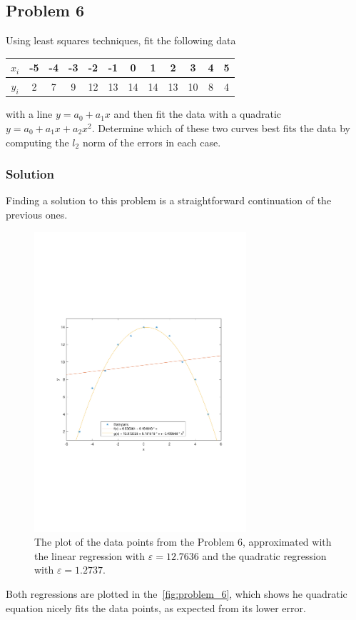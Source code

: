 \subsection{Problem 6}%
\label{sec:problem_6}
Using least squares techniques, fit the following data
\begin{center}
  \begin{tabular}{|c|c|c|c|c|c|c|c|c|c|c|c|}
    \hline
    $x_i$ & -5 & -4 & -3 & -2 & -1 & 0 & 1 & 2 & 3 & 4 & 5 \\
    \hline
    $y_i$ & 2 & 7 & 9 & 12 & 13 & 14 & 14 & 13 & 10 & 8 & 4 \\
    \hline
  \end{tabular}
\end{center}
with a line $y=a_0+a_1x$ and then fit the data with a quadratic $y=a_0+a_1x+a_2x^2$.
Determine which of these two curves best fits the data by computing the $l_2$ norm of
the errors in each case.
\subsubsection*{Solution}
Finding a solution to this problem is a straightforward continuation of the previous
ones.

\begin{figure}
  \centering
  \includegraphics[width=0.7\textwidth]{images/Problem_6_plot.pdf}
  \caption{The plot of the data points from the Problem 6, approximated with the linear
    regression with $\varepsilon = 12.7636$ and the quadratic regression with
    $\varepsilon = 1.2737$.}
  \label{fig:problem_6}
\end{figure}

Both regressions are plotted in the~\autoref{fig:problem_6}, which shows he quadratic
equation nicely fits the data points, as expected from its lower error.
